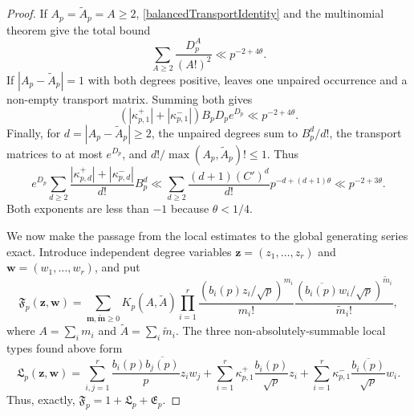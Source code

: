 \documentclass[oneside, 12pt]{amsart}
\theoremstyle{definition}
\begin{document}
\begin{proof}
		If $A_p=\widetilde A_p=A\geq2$, \eqref{balancedTransportIdentity}
		and the multinomial theorem give the total bound
		\[
		\sum_{A\geq2}\frac{D_p^A}{(A!)^2}\ll p^{-2+4\theta}.
		\]
		If $|A_p-\widetilde A_p|=1$ with both degrees positive,
		 leaves one unpaired occurrence and
		a non-empty transport matrix.  Summing both gives
		\[
		(|\kappa_{p,1}^+|+|\kappa_{p,1}^-|)B_pD_pe^{D_p}
		\ll p^{-2+4\theta}.
		\]
		Finally, for $d=|A_p-\widetilde A_p|\geq2$, the unpaired degrees sum
		to $B_p^d/d!$, the transport matrices to at most $e^{D_p}$, and
		$d!/\max(A_p,\widetilde A_p)!\leq1$.  Thus
		\[
		e^{D_p}\sum_{d\geq2}
		\frac{|\kappa_{p,d}^+|+|\kappa_{p,d}^-|}{d!}B_p^d
		\ll\sum_{d\geq2}\frac{(d+1)(C')^d}{d!}p^{-d+(d+1)\theta}
		\ll p^{-2+3\theta}.
		\]
		Both exponents are less than $-1$ because $\theta<1/4$.
		{
			We now make the passage from the local estimates to the global
			generating series exact.  Introduce independent degree variables
			$\mathbf z=(z_1,\ldots,z_r)$ and
			$\mathbf w=(w_1,\ldots,w_r)$, and put
			\[
			\mathfrak F_p(\mathbf z,\mathbf w)
			=\sum_{\mathbf m,\widetilde{\mathbf m}\geq0}
			K_p(A,\widetilde A)
			\prod_{i=1}^r
			\frac{(b_i(p)z_i/\sqrt p)^{m_i}}{m_i!}
			\frac{(\overline{b_i(p)}w_i/\sqrt p)^{\widetilde m_i}}
			{\widetilde m_i!},
			\]
			where $A=\sum_i m_i$ and $\widetilde A=\sum_i\widetilde m_i$.
			The three non-absolutely-summable local types found above form
			\[
			\mathfrak L_p(\mathbf z,\mathbf w)
			=\sum_{i,j=1}^r\frac{b_i(p)\overline{b_j(p)}}p z_iw_j
			+\sum_{i=1}^r\kappa_{p,1}^+\frac{b_i(p)}{\sqrt p}z_i
			+\sum_{i=1}^r\kappa_{p,1}^-\frac{\overline{b_i(p)}}{\sqrt p}w_i.
			\]
			Thus, exactly,
			$\mathfrak F_p=1+\mathfrak L_p+\mathfrak E_p$.
			
}
\end{proof}
\end{document}

